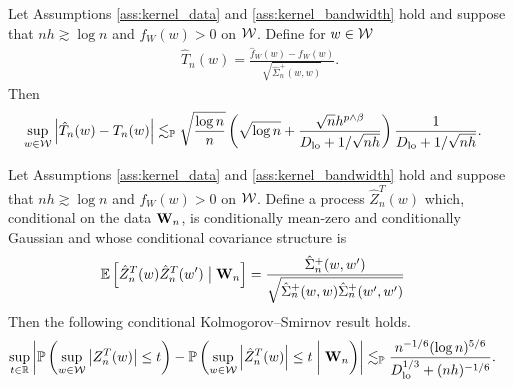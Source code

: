 \begin{lemma}
  \label{lem:studentized_t_statistic}

  Let Assumptions \ref{ass:kernel_data} and
  \ref{ass:kernel_bandwidth} hold and suppose that
  $n h \gtrsim \log n$ and $f_W(w) > 0$ on $\mathcal{W}$.
  Define for $w \in \mathcal{W}$
  \begin{align*}
    \hat T_n(w) = \frac{\hat f_W(w) - f_W(w)}
    {\sqrt{\hat\Sigma_n^+(w,w)}}.
  \end{align*}
  Then
  \begin{align*}
    \sup_{w \in \mathcal{W}}
    \left| \hat T_n(w) - T_n(w) \right|
    &\lesssim_{\mathbb{P}}
    \sqrt{\frac{\log n}{n}}
    \left(
      \sqrt{\log n} + \frac{\sqrt n h^{p \wedge \beta}}
      {D_{\textup{lo}} + 1/\sqrt{n h}}
    \right)
    \frac{1}{D_{\textup{lo}} + 1/\sqrt{n h}}.
  \end{align*}

\end{lemma}

\begin{lemma}
  \label{lem:distributional_approx_feasible_gaussian}

  Let Assumptions \ref{ass:kernel_data} and \ref{ass:kernel_bandwidth}
  hold and suppose that
  $n h \gtrsim \log n$ and $f_W(w) > 0$ on $\mathcal{W}$.
  Define a process $\hat Z_n^T(w)$ which,
  conditional on the data $\mathbf{W}_n$,
  is conditionally mean-zero and
  conditionally Gaussian and whose
  conditional covariance structure is
  \begin{align*}
    \mathbb{E}\left[
      \hat Z_n^T(w) \hat Z_n^T(w')
    \bigm| \mathbf{W}_n \right]
    &=
    \frac{\hat \Sigma_n^+(w,w')}
    {\sqrt{\hat \Sigma_n^+(w,w) \hat \Sigma_n^+(w',w')}}
  \end{align*}
  Then the following conditional
  Kolmogorov--Smirnov result holds.
  \begin{align*}
    \sup_{t \in \mathbb{R}}
    \left|
    \mathbb{P}\left(
      \sup_{w \in \mathcal{W}}
      \left| Z_n^T(w) \right|
      \leq t
    \right)
    - \mathbb{P}\left(
      \sup_{w \in \mathcal{W}}
      \left| \hat Z_n^T(w) \right|
      \leq t
      \biggm\vert \mathbf{W}_n
    \right)
    \right|
    &\lesssim_{\mathbb{P}}
    \frac{n^{-1/6}(\log n)^{5/6}}
    {D_{\textup{lo}}^{1/3} + (n h)^{-1/6}}.
  \end{align*}

\end{lemma}

